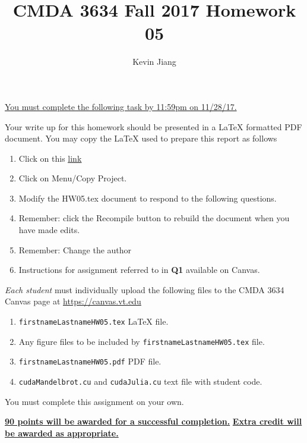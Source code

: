 \documentclass{article}
\newcommand{\pad}{\vspace{8pt}\noindent}
\newcommand{\myhref}[2]{\href{#1}{\color{foo}\underline{#2}\color{black}}}
\begin{document}
\title{CMDA 3634 Fall 2017 Homework 05}

\author{Kevin Jiang}
\vspace{-64pt}\maketitle
\begin{center}\underline{You must complete the following task by 11:59pm on 11/28/17.}\end{center}
Your write up for this homework should be presented in a {\LaTeX} formatted PDF document. You may copy the \LaTeX{} used to prepare this report as follows

\begin{enumerate}
\item Click on this  \myhref{https://www.sharelatex.com/project/5a0c6d0fe0f2720e611cca7f}{link} 
\item Click on Menu/Copy Project.
\item Modify the HW05.tex document to respond to the following questions. 
\item Remember: click the Recompile button to rebuild the document when you have made edits.
\item Remember: Change the author 
\item Instructions for assignment referred to in {\bf Q1} available on Canvas.
\end{enumerate}

\pad \emph{Each student} must individually upload the following files to the CMDA 3634 Canvas page at \myhref{https://canvas.vt.edu}{https://canvas.vt.edu}

\begin{enumerate}
\item \verb|firstnameLastnameHW05.tex| {\LaTeX} file.
\item Any figure files to be included by \verb|firstnameLastnameHW05.tex| file.
\item \verb|firstnameLastnameHW05.pdf| PDF file.
\item \verb|cudaMandelbrot.cu| and \verb|cudaJulia.cu| text file with student code. 
\end{enumerate}


\pad You must complete this assignment on your own. 

\vspace{16pt}
\begin{center}
\underline{\bf 90 points will be awarded for a successful completion.}
\vspace{8pt}\underline{\bf Extra credit will be awarded as appropriate.}
\end{center}
\end{document}
